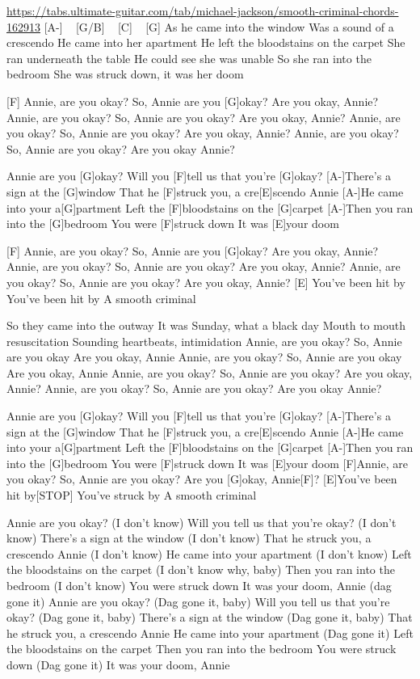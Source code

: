 \url{https://tabs.ultimate-guitar.com/tab/michael-jackson/smooth-criminal-chords-162913}
[A-] ~ [G/B] ~ [C] ~ [G]
As he came into the window
Was a sound of a crescendo
He came into her apartment
He left the bloodstains on the carpet
She ran underneath the table
He could see she was unable
So she ran into the bedroom
She was struck down, it was her doom

[F]
Annie, are you okay?
So, Annie are you [G]okay?
Are you okay, Annie?
Annie, are you okay?
So, Annie are you okay?
Are you okay, Annie?
Annie, are you okay?
So, Annie are you okay?
Are you okay, Annie?
Annie, are you okay?
So, Annie are you okay? Are you okay Annie?

Annie are you [G]okay?
Will you [F]tell us that you're [G]okay?
[A-]There's a sign at the [G]window
That he [F]struck you, a cre[E]scendo Annie
[A-]He came into your a[G]partment
Left the [F]bloodstains on the [G]carpet
[A-]Then you ran into the [G]bedroom
You were [F]struck down
It was [E]your doom

[F]
Annie, are you okay?
So, Annie are you [G]okay?
Are you okay, Annie?
Annie, are you okay?
So, Annie are you okay?
Are you okay, Annie?
Annie, are you okay?
So, Annie are you okay?
Are you okay, Annie?
[E]
You've been hit by
You've been hit by
A smooth criminal


So they came into the outway
It was Sunday, what a black day
Mouth to mouth resuscitation
Sounding heartbeats, intimidation
Annie, are you okay?
So, Annie are you okay
Are you okay, Annie
Annie, are you okay?
So, Annie are you okay
Are you okay, Annie
Annie, are you okay?
So, Annie are you okay?
Are you okay, Annie?
Annie, are you okay?
So, Annie are you okay? Are you okay Annie?

Annie are you [G]okay?
Will you [F]tell us that you're [G]okay?
[A-]There's a sign at the [G]window
That he [F]struck you, a cre[E]scendo Annie
[A-]He came into your a[G]partment
Left the [F]bloodstains on the [G]carpet
[A-]Then you ran into the [G]bedroom
You were [F]struck down
It was [E]your doom
[F]Annie, are you okay?
So, Annie are you okay?
Are you [G]okay, Annie[F]?
[E]You've been hit by[STOP]
You've struck by
A smooth criminal


Annie are you okay?
(I don't know)
Will you tell us that you're okay?
(I don't know)
There's a sign at the window
(I don't know)
That he struck you, a crescendo Annie
(I don't know)
He came into your apartment
(I don't know)
Left the bloodstains on the carpet
(I don't know why, baby)
Then you ran into the bedroom
(I don't know)
You were struck down
It was your doom, Annie (dag gone it)
Annie are you okay?
(Dag gone it, baby)
Will you tell us that you're okay?
(Dag gone it, baby)
There's a sign at the window
(Dag gone it, baby)
That he struck you, a crescendo Annie
He came into your apartment
(Dag gone it)
Left the bloodstains on the carpet
Then you ran into the bedroom
You were struck down
(Dag gone it)
It was your doom, Annie